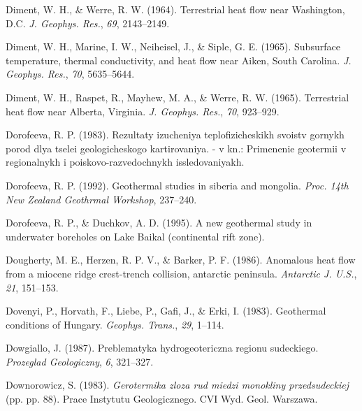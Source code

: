 \documentclass[draft,linenumbers]{agujournal2018}
\begin{document}
\leavevmode{}%
Diment, W. H., \& Werre, R. W. (1964). Terrestrial heat flow near
{Washington, D.C.} \emph{J. Geophys. Res.}, \emph{69}, 2143--2149.

\leavevmode{}%
Diment, W. H., Marine, I. W., Neiheisel, J., \& Siple, G. E. (1965).
Subsurface temperature, thermal conductivity, and heat flow near {Aiken,
South Carolina}. \emph{J. Geophys. Res.}, \emph{70}, 5635--5644.

\leavevmode{}%
Diment, W. H., Raspet, R., Mayhew, M. A., \& Werre, R. W. (1965).
Terrestrial heat flow near {Alberta, Virginia}. \emph{J. Geophys. Res.},
\emph{70}, 923--929.

\leavevmode{}%
Dorofeeva, R. P. (1983). Rezultaty izucheniya teplofizicheskikh svoistv
gornykh porod dlya tselei geologicheskogo kartirovaniya. - v kn.:
Primenenie geotermii v regionalnykh i poiskovo-razvedochnykh
issledovaniyakh.

\leavevmode{}%
Dorofeeva, R. P. (1992). Geothermal studies in siberia and mongolia.
\emph{Proc. 14th New Zealand Geothrmal Workshop}, 237--240.

\leavevmode{}%
Dorofeeva, R. P., \& Duchkov, A. D. (1995). A new geothermal study in
underwater boreholes on {Lake Baikal} (continental rift zone).

\leavevmode{}%
Dougherty, M. E., Herzen, R. P. V., \& Barker, P. F. (1986). Anomalous
heat flow from a miocene ridge crest-trench collision, antarctic
peninsula. \emph{Antarctic J. U.S.}, \emph{21}, 151--153.

\leavevmode{}%
Dovenyi, P., Horvath, F., Liebe, P., Gafi, J., \& Erki, I. (1983).
Geothermal conditions of {Hungary}. \emph{Geophys. Trans.}, \emph{29},
1--114.

\leavevmode{}%
Dowgiallo, J. (1987). Preblematyka hydrogeotericzna regionu sudeckiego.
\emph{Prozeglad Geologiczny}, \emph{6}, 321--327.

\leavevmode{}%
Downorowicz, S. (1983). \emph{Gerotermika zloza rud miedzi monokliny
przedsudeckiej} (pp. pp. 88). Prace Instytutu Geologicznego. CVI Wyd.
Geol. Warszawa.
\end{document}
